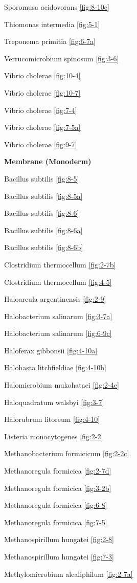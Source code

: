 \documentclass[]{tufte-book}
\begin{document}
Sporomusa acidovorans \ref{fig:8-10c}

Thiomonas intermedia \ref{fig:5-1}

Treponema primitia \ref{fig:6-7a}

Verrucomicrobium spinosum \ref{fig:3-6}

Vibrio cholerae \ref{fig:10-4}

Vibrio cholerae \ref{fig:10-7}

Vibrio cholerae \ref{fig:7-4}

Vibrio cholerae \ref{fig:7-5a}

Vibrio cholerae \ref{fig:9-7}

\textbf{Membrane (Monoderm)}

Bacillus subtilis \ref{fig:8-5}

Bacillus subtilis \ref{fig:8-5a}

Bacillus subtilis \ref{fig:8-6}

Bacillus subtilis \ref{fig:8-6a}

Bacillus subtilis \ref{fig:8-6b}

Clostridium thermocellum \ref{fig:2-7b}

Clostridium thermocellum \ref{fig:4-5}

Haloarcula argentinensis \ref{fig:2-9}

Halobacterium salinarum \ref{fig:3-7a}

Halobacterium salinarum \ref{fig:6-9c}

Haloferax gibbonsii \ref{fig:4-10a}

Halohasta litchfieldiae \ref{fig:4-10b}

Halomicrobium mukohataei \ref{fig:2-4e}

Haloquadratum walsbyi \ref{fig:3-7}

Halorubrum litoreum \ref{fig:4-10}

Listeria monocytogenes \ref{fig:2-2}

Methanobacterium formicicum \ref{fig:2-2c}

Methanoregula formicica \ref{fig:2-7d}

Methanoregula formicica \ref{fig:3-2b}

Methanoregula formicica \ref{fig:6-8}

Methanoregula formicica \ref{fig:7-5}

Methanospirillum hungatei \ref{fig:2-8}

Methanospirillum hungatei \ref{fig:7-3}

Methylomicrobium alcaliphilum \ref{fig:2-7a}
\end{document}
